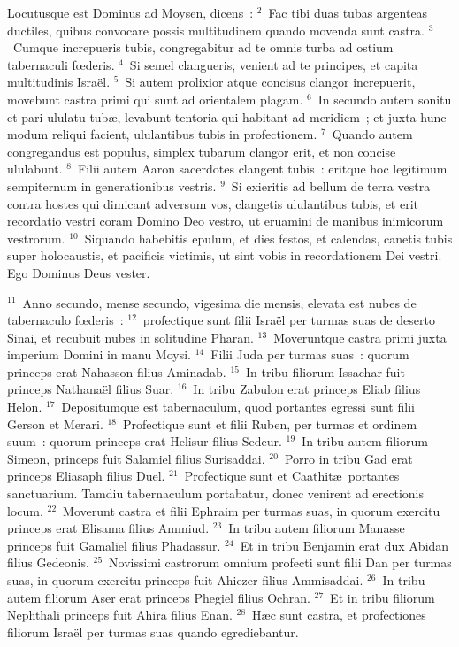 \lettrine[lines=3,image=true,loversize=0.05,lraise=-0.03]{L}{}ocutusque est Dominus ad Moysen, dicens~:
${}^{2}$~Fac tibi duas tubas argenteas ductiles, quibus convocare possis multitudinem quando movenda sunt castra.
${}^{3}$~Cumque increpueris tubis, congregabitur ad te omnis turba ad ostium tabernaculi fœderis.
${}^{4}$~Si semel clangueris, venient ad te principes, et capita multitudinis Isra\"el.
${}^{5}$~Si autem prolixior atque concisus clangor increpuerit, movebunt castra primi qui sunt ad orientalem plagam.
${}^{6}$~In secundo autem sonitu et pari ululatu tub\ae , levabunt tentoria qui habitant ad meridiem~; et juxta hunc modum reliqui facient, ululantibus tubis in profectionem.
${}^{7}$~Quando autem congregandus est populus, simplex tubarum clangor erit, et non concise ululabunt.
${}^{8}$~Filii autem Aaron sacerdotes clangent tubis~: eritque hoc legitimum sempiternum in generationibus vestris.
${}^{9}$~Si exieritis ad bellum de terra vestra contra hostes qui dimicant adversum vos, clangetis ululantibus tubis, et erit recordatio vestri coram Domino Deo vestro, ut eruamini de manibus inimicorum vestrorum.
${}^{10}$~Siquando habebitis epulum, et dies festos, et calendas, canetis tubis super holocaustis, et pacificis victimis, ut sint vobis in recordationem Dei vestri. Ego Dominus Deus vester.


${}^{11}$~Anno secundo, mense secundo, vigesima die mensis, elevata est nubes de tabernaculo fœderis~:
${}^{12}$~profectique sunt filii Isra\"el per turmas suas de deserto Sinai, et recubuit nubes in solitudine Pharan.
${}^{13}$~Moveruntque castra primi juxta imperium Domini in manu Moysi.
${}^{14}$~Filii Juda per turmas suas~: quorum princeps erat Nahasson filius Aminadab.
${}^{15}$~In tribu filiorum Issachar fuit princeps Nathana\"el filius Suar.
${}^{16}$~In tribu Zabulon erat princeps Eliab filius Helon.
${}^{17}$~Depositumque est tabernaculum, quod portantes egressi sunt filii Gerson et Merari.
${}^{18}$~Profectique sunt et filii Ruben, per turmas et ordinem suum~: quorum princeps erat Helisur filius Sedeur.
${}^{19}$~In tribu autem filiorum Simeon, princeps fuit Salamiel filius Surisaddai.
${}^{20}$~Porro in tribu Gad erat princeps Eliasaph filius Duel.
${}^{21}$~Profectique sunt et Caathit\ae\ portantes sanctuarium. Tamdiu tabernaculum portabatur, donec venirent ad erectionis locum.
${}^{22}$~Moverunt castra et filii Ephraim per turmas suas, in quorum exercitu princeps erat Elisama filius Ammiud.
${}^{23}$~In tribu autem filiorum Manasse princeps fuit Gamaliel filius Phadassur.
${}^{24}$~Et in tribu Benjamin erat dux Abidan filius Gedeonis.
${}^{25}$~Novissimi castrorum omnium profecti sunt filii Dan per turmas suas, in quorum exercitu princeps fuit Ahiezer filius Ammisaddai.
${}^{26}$~In tribu autem filiorum Aser erat princeps Phegiel filius Ochran.
${}^{27}$~Et in tribu filiorum Nephthali princeps fuit Ahira filius Enan.
${}^{28}$~H\ae c sunt castra, et profectiones filiorum Isra\"el per turmas suas quando egrediebantur.


